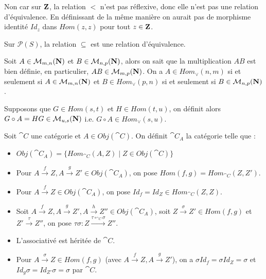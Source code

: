 \begin{exercice}
    Non car sur $\mathbf{Z}$, la relation $<$ n'est pas réflexive, donc elle n'est pas une relation d'équivalence.
    En définissant de la même manière on aurait pas de morphisme identité $Id_z$ dans $Hom(z,z)$ pour tout $z \in \mathbf{Z}$.
\end{exercice}

\begin{exercice}
    Sur $\mathcal{P}(S)$, la relation $\subseteq$ est une relation d'équivalence.
\end{exercice}

\begin{exercice}
    Soit $A \in \mathcal{M}_{m,n}(\mathbf{N})$ et $B \in \mathcal{M}_{n,p}(\mathbf{N})$, alors on sait que la multiplication $AB$ est bien 
    définie, en particulier, $AB \in \mathcal{M}_{m,p}(\mathbf{N})$. On a $A \in Hom_\vee(n,m)$ si et seulement si $A \in \mathcal{M}_{m,n}(\mathbf{N})$
    et $B \in Hom_\vee(p,n)$ si et seulement si $B \in \mathcal{M}_{n,p}(\mathbf{N})$.
    
    Supposons que $G \in Hom(s,t)$ et $H \in Hom(t,u)$, on définit alors $G \circ A = HG \in \mathcal{M}_{u,s}(\mathbf{N})$ i.e. $G \circ A \in Hom_\vee(s,u)$.
\end{exercice}

\begin{exercice}
    Soit $\cat{C}$ une catégorie et $A \in Obj(\cat{C})$. On définit $\cat{C}_A$ la catégorie telle que :
    \begin{itemize}
        \item $Obj(\cat{C}_A) = \{Hom_{\cat{C}}(A,Z) \mid Z \in Obj(\cat{C})\}$
        \item Pour $A \xrightarrow{f} Z, A \xrightarrow{g} Z' \in Obj(\cat{C}_A)$,
        on pose $Hom(f,g) = Hom_{\cat{C}}(Z,Z')$.
        \item Pour $A \xrightarrow{f} Z \in Obj(\cat{C}_A)$, on pose $Id_f = Id_Z \in Hom_{\cat{C}}(Z,Z)$.
        \item Soit $A \xrightarrow{f} Z, A \xrightarrow{g} Z',A \xrightarrow{h} Z'' \in Obj(\cat{C}_A)$, soit $Z \xrightarrow{\sigma} Z'\in Hom(f,g)$ et 
        $Z' \xrightarrow{\tau} Z''$, on pose $\tau \sigma : Z \xrightarrow{\tau \circ_{\cat{C}} \sigma} Z''$.
        \item L'associativé est héritée de $\cat{C}$.
        \item Pour $A \xrightarrow{\sigma} Z \in Hom(f,g)$ (avec $A \xrightarrow{f} Z, A \xrightarrow{g} Z'$), on a $\sigma Id_f = \sigma Id_Z = \sigma$ et
        $Id_g \sigma = Id_{Z'} \sigma = \sigma$ par $\cat{C}$.
    \end{itemize}
\end{exercice}

\begin{exercice}
    
\end{exercice}